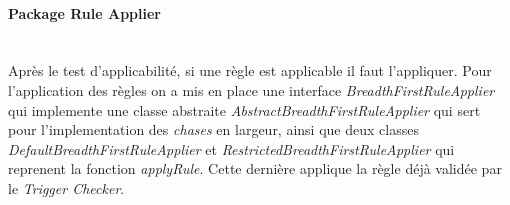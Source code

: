     \paragraph{Package Rule Applier}\ \\
    Après le test d'applicabilité, si une règle est applicable il faut l'appliquer. Pour l'application des règles on a mis en place une interface \textit{BreadthFirstRuleApplier} qui implemente une classe abstraite \textit{AbstractBreadthFirstRuleApplier} qui sert pour l'implementation des \textit{chases} en largeur, ainsi que deux classes \textit{DefaultBreadthFirstRuleApplier} et \textit{RestrictedBreadthFirstRuleApplier} qui reprenent la fonction \textit{applyRule}. Cette dernière applique la règle déjà validée par le \textit{Trigger Checker}.     
        
        
